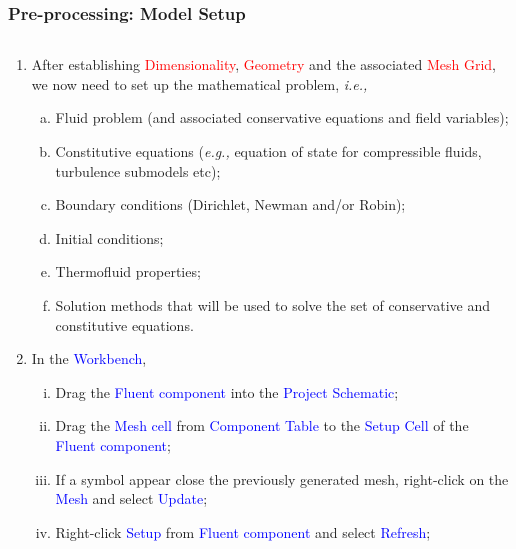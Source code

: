 \documentclass[10pt,compress, unknownkeysallowed]{beamer}
\newcommand{\red}{\textcolor{red}}
\newcommand{\blue}{\textcolor{blue}}
\newcommand{\eg}{{\it e.g., }}
\newcommand{\ie}{{\it i.e., }}
\begin{document}
\begin{frame}
  \frametitle{Pre-processing: Model Setup}
    \begin{columns}
        \begin{column}[l]{0.5\linewidth}
           \begin{enumerate}\scriptsize
                \item<1-> After establishing \red{Dimensionality}, \red{Geometry} and the associated \red{Mesh Grid}, we now need to set up the mathematical problem, \ie
                    \begin{enumerate}[a)]\scriptsize
                       \item<2-> Fluid problem (and associated conservative equations and field variables);
                       \item<2-> Constitutive equations (\eg equation of state for compressible fluids, turbulence submodels etc);                 
                       \item<2-> Boundary conditions (Dirichlet, Newman and/or Robin);                 
                       \item<2-> Initial conditions;                 
                       \item<2-> Thermofluid properties; 
                       \item<2-> Solution methods that will be used to solve the set of conservative and constitutive equations. 
                    \end{enumerate}
                \item<3-> In the \blue{Workbench},
                    \begin{enumerate}[i)]\scriptsize
                       \item<3-> Drag the \blue{Fluent component} into the \blue{Project Schematic};
                       \item<3-> Drag the \blue{Mesh cell} from \blue{Component Table} to the \blue{Setup Cell} of the \blue{Fluent component};
                       \item<3-> If a symbol appear close the previously generated mesh, right-click on the \blue{Mesh} and select \blue{Update};
                       \item<3-> Right-click \blue{Setup} from \blue{Fluent component} and select \blue{Refresh};
                    \end{enumerate}                    
           \end{enumerate}
        \end{column}

\end{columns}
\end{frame}
\end{document}

